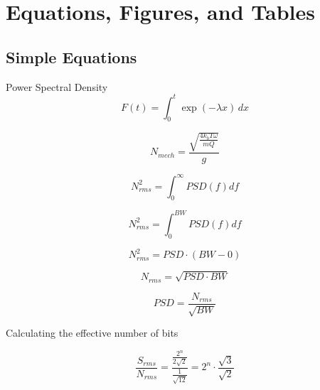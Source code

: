 \chapter[Equations, etc]{Equations, Figures, and Tables}

\section{Simple Equations}
Power Spectral Density
\begin{equation}
F(t)=\int_0^t \exp(-\lambda x)\,dx
\label{eq1}
\end{equation}

\begin{equation}
N_{mech}=\frac{\sqrt{\frac{4 k_b T \omega}{m Q}}}{g}
\label{eq1}
\end{equation}


\begin{equation}
N^{2}_{rms}=\int_0^\infty{PSD(f)df}
\label{eq2}
\end{equation}

\begin{equation}
N^{2}_{rms}=\int_0^{BW}{PSD(f)df}
\label{eq3}
\end{equation}

\begin{equation}
N^{2}_{rms}=PSD \cdot (BW - 0)
\label{eq4}
\end{equation}

\begin{equation}
N_{rms}=\sqrt{PSD \cdot BW}
\label{eq5}
\end{equation}

\begin{equation}
PSD = \frac{N_{rms}}{\sqrt{BW}}
\label{eq6}
\end{equation}

Calculating the effective number of bits

\begin{equation}
\frac{S_{rms}}{N_{rms}} = \frac{\frac{2^n}{2\sqrt{2}}}{\frac{1}{\sqrt{12}}} = 2^n \cdot \frac{\sqrt{3}}{\sqrt{2}}
\label{eq7}
\end{equation}

